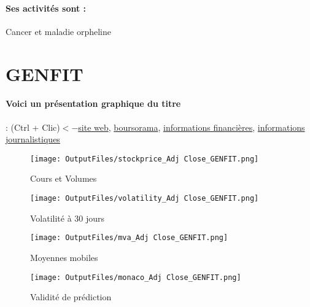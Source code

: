 \documentclass[11pt,a4paper]{report}%
\begin{document}
\paragraph{Ses activités sont : } Cancer et maladie orpheline 
    
    \newpage

\section{GENFIT}

\paragraph{Voici un présentation graphique du titre} : (Ctrl + Clic)$<-$\href{https://ir.genfit.com/fr/investor-relations}{site web}, \href{https://www.boursorama.com/cours/1rPGNFT}{boursorama}, \href{https://www.qwant.com/?q=site:https:%2f%2fwww.easybourse.com%2faction-societe%2fGENFIT&t=web&client=ext-firefox-hp}{informations financières}, \href{https://bourse.lerevenu.com/cours-de-bourse/fiche-valeur-synthese/GENFIT/GNFT-FR}{informations journalistiques}
\begin{figure}[!htb]
   \begin{minipage}{0.5\textwidth}
     \centering
     \texttt{[image: OutputFiles/stockprice\_Adj Close\_GENFIT.png]}
     \caption{Cours et Volumes}\label{Fig:price_GENFIT}
   \end{minipage}\hfill
   \begin{minipage}{0.5\textwidth}
     \centering
     \texttt{[image: OutputFiles/volatility\_Adj Close\_GENFIT.png]}
     \caption{Volatilité à 30 jours}\label{Fig:volat_GENFIT}
   \end{minipage}
\end{figure}
\begin{figure}[!htb]
   \begin{minipage}{0.5\textwidth}
     \centering
     \texttt{[image: OutputFiles/mva\_Adj Close\_GENFIT.png]}
     \caption{Moyennes mobiles}\label{Fig:mva_GENFIT}
   \end{minipage}\hfill
   \begin{minipage}{0.5\textwidth}
     \centering
     \texttt{[image: OutputFiles/monaco\_Adj Close\_GENFIT.png]}
     \caption{Validité de prédiction}\label{Fig:prediction_GENFIT}
   \end{minipage}
\end{figure}
\end{document}
